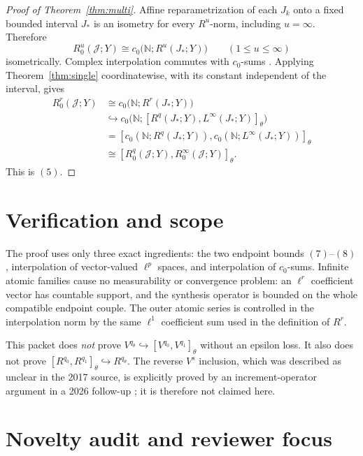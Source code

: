 \documentclass[10pt]{article}
\newcommand{\N}{\mathbb N}
\newcommand{\cJ}{\mathcal J}
\newcommand{\1}{\mathbf 1}
\begin{document}
\begin{proof}[Proof of Theorem~\ref{thm:multi}]
Affine reparametrization of each \(J_k\) onto a fixed bounded interval
\(J_*\) is an isometry for every \(R^u\)-norm, including \(u=\infty\).
Therefore
\[
 R_0^u(\cJ;Y)
 \cong c_0\bigl(\N;R^u(J_*;Y)\bigr)
 \qquad(1\leq u\leq\infty)
 \tag{13}
\]
isometrically.  Complex interpolation commutes with \(c_0\)-sums
\cite[Remark 3, Section 1.18.1]{Triebel}.  Applying
Theorem~\ref{thm:single} coordinatewise, with its constant independent of
the interval, gives
\[
\begin{aligned}
 R_0^r(\cJ;Y)
 &\cong c_0\bigl(\N;R^r(J_*;Y)\bigr)\\
 &\hookrightarrow
 c_0\bigl(\N;[R^q(J_*;Y),L^\infty(J_*;Y)]_\theta\bigr)\\
 &=
 [c_0(\N;R^q(J_*;Y)),c_0(\N;L^\infty(J_*;Y))]_\theta\\
 &\cong [R_0^q(\cJ;Y),R_0^\infty(\cJ;Y)]_\theta.
\end{aligned}
\]
This is \((5)\).
\end{proof}

\section{Verification and scope}

The proof uses only three exact ingredients: the two endpoint bounds
\((7)\)--\((8)\), interpolation of vector-valued \(\ell^p\) spaces, and
interpolation of \(c_0\)-sums.  Infinite atomic families cause no
measurability or convergence problem: an \(\ell^r\) coefficient vector
has countable support, and the synthesis operator is bounded on the whole
compatible endpoint couple.  The outer atomic series is controlled in the
interpolation norm by the same \(\ell^1\) coefficient sum used in the
definition of \(R^r\).

This packet does \emph{not} prove
\(V^{q_\theta}\hookrightarrow[V^{q_0},V^{q_1}]_\theta\) without an
epsilon loss.  It also does not prove
\([R^{q_0},R^{q_1}]_\theta\hookrightarrow R^{q_\theta}\).
The reverse \(V^s\) inclusion, which was described as unclear in the 2017
source, is explicitly proved by an increment-operator argument in a 2026
follow-up \cite[Lemma 2.4]{DLV}; it is therefore not claimed here.

\section{Novelty audit and reviewer focus}
\end{document}
